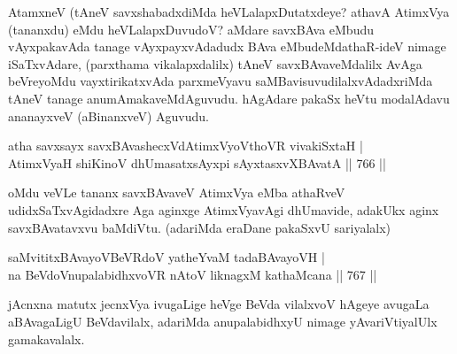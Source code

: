 \begin{artha}
AtamxneV (tAneV savxshabadxdiMda heVLalapxDutatxdeye? athavA AtimxVya (tananxdu) eMdu heVLalapxDuvudoV? aMdare savxBAva eMbudu vAyxpakavAda tanage vAyxpayxvAdadudx BAva eMbudeMdathaR-ideV nimage iSaTxvAdare, (parxthama vikalapxdalilx) tAneV savxBAvaveMdalilx AvAga beVreyoMdu vayxtirikatxvAda parxmeVyavu saMBavisuvudilalxvAdadxriMda tAneV tanage anumAmakaveMdAguvudu. hAgAdare pakaSx heVtu modalAdavu ananayxveV (aBinanxveV) Aguvudu.
\end{artha}

\begin{shl}
atha savxsayx savxBAvashecxVdAtimxVyoV\s thoVR vivakiSxtaH | \\
AtimxVyaH shiKinoV dhUmasatxsAyxpi sAyxtasxvXBAvatA \hfill||  766 ||  
\end{shl}

\begin{artha}
oMdu veVLe tananx savxBAvaveV AtimxVya eMba athaRveV udidxSaTxvAgidadxre Aga aginxge AtimxVyavAgi dhUmavide, adakUkx aginx savxBAvatavxvu baMdiVtu. (adariMda eraDane pakaSxvU sariyalalx)
\end{artha}


\begin{shl}
\footnotemark[1]saMvititxBAvayoVBeVRdoV yatheYvaM tadaBAvayoVH | \\
na BeVdoV\s nupalabidhxvoVR nAtoV liknagxM kathaMcana \hfill||  767 ||  
\end{shl}

\begin{artha}
jAcnxna matutx jecnxVya ivugaLige heVge BeVda vilalxvoV hAgeye avugaLa aBAvagaLigU BeVdavilalx, adariMda anupalabidhxyU nimage yAvariVtiyalUlx gamakavalalx.
\end{artha}

